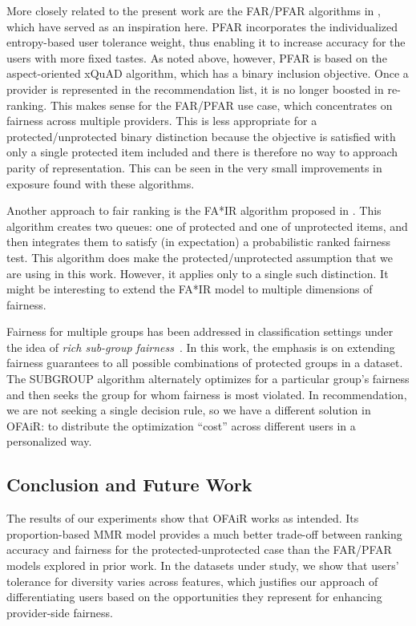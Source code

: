 More closely related to the present work are the FAR/PFAR algorithms in \cite{liu2018personalizing,liu2019personalized}, which have served as an inspiration here. PFAR incorporates the individualized entropy-based user tolerance weight, thus enabling it to increase accuracy for the users with more fixed tastes. As noted above, however, PFAR is based on the aspect-oriented xQuAD algorithm, which has a binary inclusion objective. Once a provider is represented in the recommendation list, it is no longer boosted in re-ranking. This makes sense for the FAR/PFAR use case, which concentrates on fairness across multiple providers. This is less appropriate for a protected/unprotected binary distinction because the objective is satisfied with only a single protected item included and there is therefore no way to approach parity of representation. This can be seen in the very small improvements in exposure found with these algorithms. 

Another approach to fair ranking is the FA*IR algorithm proposed in \cite{zehlike2017fa}. This algorithm creates two queues: one of protected and one of unprotected items, and then integrates them to satisfy (in expectation) a probabilistic ranked fairness test. This algorithm does make the protected/unprotected assumption that we are using in this work. However, it applies only to a single such distinction. It might be interesting to extend the FA*IR model to multiple dimensions of fairness.

Fairness for multiple groups has been addressed in classification settings under the idea of \textit{rich sub-group fairness}~\cite{kearns2017preventing,kearns2019empirical}. In this work, the emphasis is on extending fairness guarantees to all possible combinations of protected groups in a dataset. The SUBGROUP algorithm alternately optimizes for a particular group's fairness and then seeks the group for whom fairness is most violated. In recommendation, we are not seeking a single decision rule, so we have a different solution in OFAiR: to distribute the optimization ``cost'' across different users in a personalized way.

\subsection{Conclusion and Future Work}
\label{subsec:ofair_conclusion}

The results of our experiments show that OFAiR works as intended. Its proportion-based MMR model provides a much better trade-off between ranking accuracy and fairness for the protected-unprotected case than the FAR/PFAR models explored in prior work. In the datasets under study, we show that users' tolerance for diversity varies across features, which justifies our approach of differentiating users based on the opportunities they represent for enhancing provider-side fairness. 

